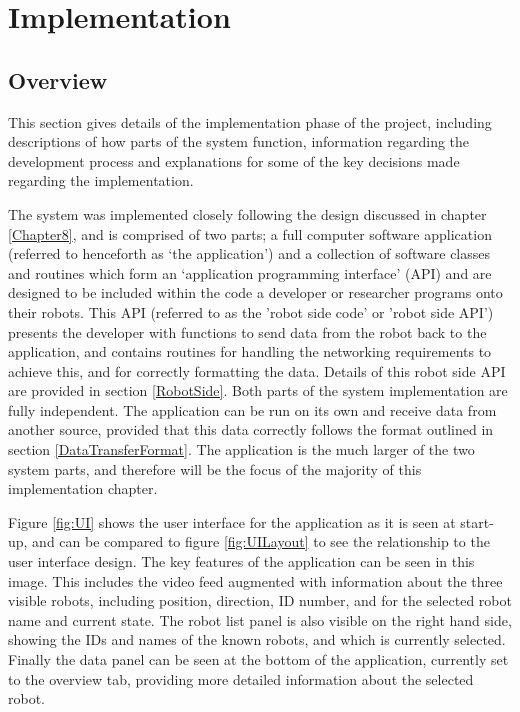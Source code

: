 
\chapter[Implementation]{Implementation} %

\label{Chapter9} %


\section{Overview}
This section gives details of the implementation phase of the project, including descriptions of how parts of the system function, information regarding the development process and explanations for some of the key decisions made regarding the implementation.

The system was implemented closely following the design discussed in chapter \ref{Chapter8}, and is comprised of two parts; a full computer software application (referred to henceforth as `the application') and a collection of software classes and routines which form an `application programming interface' (API) and are designed to be included within the code a developer or researcher programs onto their robots. This API (referred to as the 'robot side code' or 'robot side API') presents the developer with functions to send data from the robot back to the application, and contains routines for handling the networking requirements to achieve this, and for correctly formatting the data. Details of this robot side API are provided in section \ref{RobotSide}. Both parts of the system implementation are fully independent. The application can be run on its own and receive data from another source, provided that this data correctly follows the format outlined in section \ref{DataTransferFormat}. The application is the much larger of the two system parts, and therefore will be the focus of the majority of this implementation chapter.

Figure \ref{fig:UI} shows the user interface for the application as it is seen at start-up, and can be compared to figure \ref{fig:UILayout} to see the relationship to the user interface design. The key features of the application can be seen in this image. This includes the video feed augmented with information about the three visible robots, including position, direction, ID number, and for the selected robot name and current state. The robot list panel is also visible on the right hand side, showing the IDs and names of the known robots, and which is currently selected. Finally the data panel can be seen at the bottom of the application, currently set to the overview tab, providing more detailed information about the selected robot.


